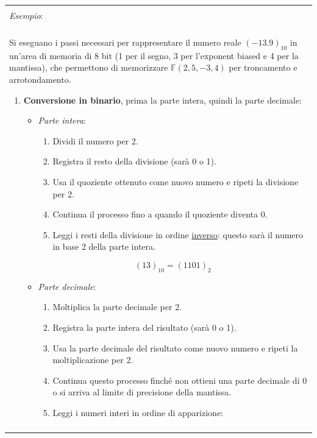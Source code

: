 \documentclass{article}
\numberwithin{equation}{section}
\newenvironment{example}
{\begin{center}
        \begin{tabular}{|p{0.9\textwidth}|}
            \hline \\ 
            \textit{Esempio}: \\\\ 
        }
        {
            \\\\ \hline
        \end{tabular}
    \end{center}
}
\begin{document}
\begin{example}
    Si eseguano i passi necessari per rappresentare il numero reale
    $(-13.9)_{10}$ in un'area di memoria di 8 bit (1 per il segno, 3 per
    l'exponent biased e 4 per la mantissa), che permettono di memorizzare
    $\mathbb{F}(2,5,-3,4)$ per troncamento e arrotondamento.
    \vskip 0.1in
    \begin{enumerate}
        \item \textbf{Conversione in binario}, prima la parte intera, quindi la parte decimale:
            \begin{itemize}
                \item \textit{Parte intera}:
                    \begin{enumerate}
                        \item Dividi il numero per 2.
                        \item Registra il resto della divisione (sarà 0 o 1).
                        \item Usa il quoziente ottenuto come nuovo numero e
                            ripeti la divisione per 2.
                        \item Continua il processo fino a quando il quoziente
                            diventa 0.
                        \item Leggi i resti della divisione in ordine
                            \underline{inverso}:
                            questo sarà il numero in base 2 della parte
                            intera.
                    \end{enumerate}
                    $$(13)_{10}=(1101)_2$$
                \item \textit{Parte decimale}:
                    \begin{enumerate}
                        \item Moltiplica la parte decimale per 2.
                        \item Registra la parte intera del risultato (sarà 0 o
                            1).
                        \item Usa la parte decimale del risultato come nuovo
                            numero e ripeti la moltiplicazione per 2.
                        \item Continua questo processo finché non ottieni una
                            parte decimale di 0 o si arriva al limite di
                            precisione della mantissa.
                        \item Leggi i numeri interi in ordine di apparizione:

\end{enumerate}
\end{itemize}
\end{enumerate}
\end{example}
\end{document}
